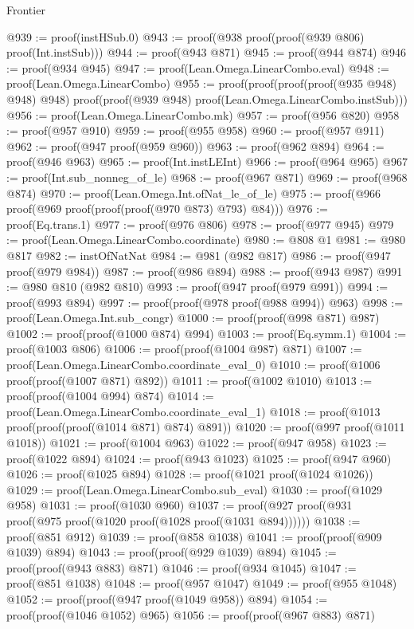 \begin{lexlean}{Frontier}
\begin{coremodule}
@939 := proof(instHSub.{0})
@943 := proof(@938 proof(proof(@939 @806) proof(Int.instSub)))
@944 := proof(@943 @871)
@945 := proof(@944 @874)
@946 := proof(@934 @945)
@947 := proof(Lean.Omega.LinearCombo.eval)
@948 := proof(Lean.Omega.LinearCombo)
@955 := proof(proof(proof(proof(@935 @948) @948) @948)
      proof(proof(@939 @948) proof(Lean.Omega.LinearCombo.instSub)))
@956 := proof(Lean.Omega.LinearCombo.mk)
@957 := proof(@956 @820)
@958 := proof(@957 @910)
@959 := proof(@955 @958)
@960 := proof(@957 @911)
@962 := proof(@947 proof(@959 @960))
@963 := proof(@962 @894)
@964 := proof(@946 @963)
@965 := proof(Int.instLEInt)
@966 := proof(@964 @965)
@967 := proof(Int.sub_nonneg_of_le)
@968 := proof(@967 @871)
@969 := proof(@968 @874)
@970 := proof(Lean.Omega.Int.ofNat_le_of_le)
@975 := proof(@966 proof(@969 proof(proof(proof(@970 @873) @793) @84)))
@976 := proof(Eq.trans.{1})
@977 := proof(@976 @806)
@978 := proof(@977 @945)
@979 := proof(Lean.Omega.LinearCombo.coordinate)
@980 := @808 @1
@981 := @980 @817
@982 := instOfNatNat
@984 := @981 (@982 @817)
@986 := proof(@947 proof(@979 @984))
@987 := proof(@986 @894)
@988 := proof(@943 @987)
@991 := @980 @810 (@982 @810)
@993 := proof(@947 proof(@979 @991))
@994 := proof(@993 @894)
@997 := proof(proof(@978 proof(@988 @994)) @963)
@998 := proof(Lean.Omega.Int.sub_congr)
@1000 := proof(proof(@998 @871) @987)
@1002 := proof(proof(@1000 @874) @994)
@1003 := proof(Eq.symm.{1})
@1004 := proof(@1003 @806)
@1006 := proof(proof(@1004 @987) @871)
@1007 := proof(Lean.Omega.LinearCombo.coordinate_eval_0)
@1010 := proof(@1006 proof(proof(@1007 @871) @892))
@1011 := proof(@1002 @1010)
@1013 := proof(proof(@1004 @994) @874)
@1014 := proof(Lean.Omega.LinearCombo.coordinate_eval_1)
@1018 := proof(@1013 proof(proof(proof(@1014 @871) @874) @891))
@1020 := proof(@997 proof(@1011 @1018))
@1021 := proof(@1004 @963)
@1022 := proof(@947 @958)
@1023 := proof(@1022 @894)
@1024 := proof(@943 @1023)
@1025 := proof(@947 @960)
@1026 := proof(@1025 @894)
@1028 := proof(@1021 proof(@1024 @1026))
@1029 := proof(Lean.Omega.LinearCombo.sub_eval)
@1030 := proof(@1029 @958)
@1031 := proof(@1030 @960)
@1037 := proof(@927 proof(@931 proof(@975 proof(@1020 proof(@1028 proof(@1031 @894))))))
@1038 := proof(@851 @912)
@1039 := proof(@858 @1038)
@1041 := proof(proof(@909 @1039) @894)
@1043 := proof(proof(@929 @1039) @894)
@1045 := proof(proof(@943 @883) @871)
@1046 := proof(@934 @1045)
@1047 := proof(@851 @1038)
@1048 := proof(@957 @1047)
@1049 := proof(@955 @1048)
@1052 := proof(proof(@947 proof(@1049 @958)) @894)
@1054 := proof(proof(@1046 @1052) @965)
@1056 := proof(proof(@967 @883) @871)

\end{coremodule}
\end{lexlean}

